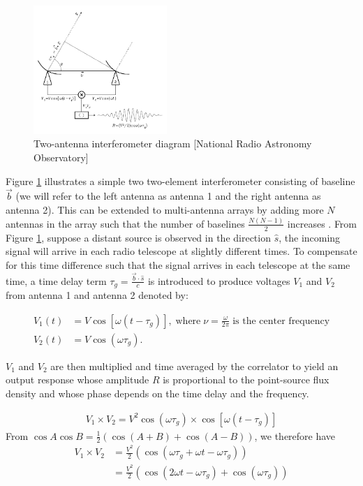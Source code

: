 \begin{figure}[h!]
  \centering
    \includegraphics[width=0.45\textwidth]{images/Rint.png}
    \caption{Two-antenna interferometer diagram [National Radio Astronomy Observatory]}
  \label{images/Rint.png}
\end{figure}

Figure \ref{images/Rint.png} illustrates a simple two two-element interferometer consisting of baseline $\overrightarrow{b}$ (we will refer to the left antenna as antenna 1 and the right antenna as antenna 2). This can be extended to multi-antenna arrays by adding more $N$ antennas in the array such that the number of baselines  $\frac{N(N-1)}{2}$  increases \citep{thompson2001interferometry}. From Figure \ref{images/Rint.png}, suppose a distant source is observed in the direction $\widehat{s}$, the incoming signal will arrive in each radio telescope at slightly  different times. To compensate for this time difference such that the signal arrives in each telescope at the same time, a time delay term $\tau_{g}=\frac{\overrightarrow{b}\cdot\widehat{s}}{c}$ is introduced to produce voltages $V_1$ and $V_2$ from antenna 1 and antenna 2 denoted by: 

\begin{equation}\label{eq111}
\begin{split}
V_1(t)&=V\cos[\omega(t-\tau_{g})],\; \text{where} \;\nu=\frac{\omega}{2\pi}\; \text{is the center frequency} \\
V_2(t)&=V\cos(\omega\tau_{g}).
\end{split}
\end{equation}

$V_1$ and $V_2$ are then  multiplied and time averaged by the correlator to yield an output response whose amplitude $R$ is proportional to the point-source flux density and whose phase depends on the time delay and the frequency.

\begin{align}
V_1 \times V_2 = V^2 \cos(\omega\tau_{g})\times \cos[\omega(t-\tau_{g})]
\end{align}
From $\cos A\cos B= \frac{1}{2} \left(\cos (A+B) + \cos (A-B) \right)$, 
we therefore have 
\begin{align*}
V_1 \times V_2&= \frac{V^2}{2} \left( \cos(\omega\tau_{g} + \omega t-\omega \tau_{g} )\right)\\
&= \frac{V^2}{2} \left(\cos(2\omega t - \omega \tau_{g}) + \cos (\omega\tau_{g})\right)
\end{align*}

